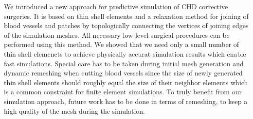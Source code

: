 We introduced a new approach for predictive simulation of CHD corrective surgeries. It is based on thin shell elements and a relaxation method for joining of blood vessels and patches by topologically connecting the vertices of joining edges of the simulation meshes. All necessary low-level surgical procedures can be performed using this method. We showed that we need only a small number of thin shell elemenets to achieve physically accurat simulation results which enable fast simulations. Special care has to be taken during initial mesh generation and dynamic remeshing when cutting blood vessels since the size of newly generated thin shell elements should roughly equal the size of their neighbor elements which is a common constraint for finite element simulations. To truly benefit from our simulation approach, future work has to be done in terms of remeshing, to keep a high quality of the mesh during the simulation.